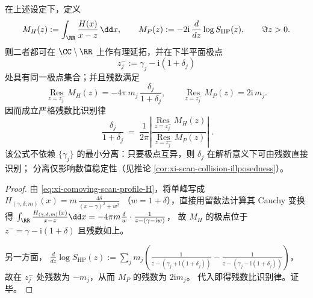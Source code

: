 

\begin{theorem}\label{thm:xi-double-herglotz-residue-ratio}
在上述设定下，定义
\[
M_H(z):=\int_{\RR}\frac{H(x)}{x-z}\,\dd x,
\qquad
M_P(z):=-2\mathrm{i}\,\frac{d}{dz}\log S_{\mathrm{HP}}(z),
\qquad \Im z>0.
\]
则二者都可在 \(\CC\setminus\RR\) 上作有理延拓，并在下半平面极点
\[
z_j^-:=\gamma_j-\mathrm{i}(1+\delta_j)
\]
处具有同一极点集合；并且残数满足
\[
\operatorname*{Res}_{z=z_j^-} M_H(z)= -4\pi\,m_j\,\frac{\delta_j}{1+\delta_j},
\qquad
\operatorname*{Res}_{z=z_j^-} M_P(z)= 2\mathrm{i}\,m_j.
\]
因而成立严格残数比识别律
\[
\boxed{\;
\frac{\delta_j}{1+\delta_j}
\ =\
\frac{1}{2\pi}\left|\frac{\operatorname*{Res}_{z=z_j^-} M_H(z)}{\operatorname*{Res}_{z=z_j^-} M_P(z)}\right|\; }.
\]
该公式不依赖 \(\{\gamma_j\}\) 的最小分离：只要极点互异，则 \(\delta_j\) 在解析意义下可由残数直接识别；
分离仅影响数值稳定性（见推论 \ref{cor:xi-scan-collision-illposedness}）。
\end{theorem}

\begin{proof}
由 \eqref{eq:xi-comoving-scan-profile-H}，将单峰写成
\(
H_{(\gamma,\delta,m)}(x)=m\,\frac{4\delta}{(x-\gamma)^2+w^2}
\)
（\(w=1+\delta\)），直接用留数法计算其 Cauchy 变换得
\(
\int_{\RR}\frac{H_{(\gamma,\delta,m)}(x)}{x-z}\dd x
=-4\pi m\frac{\delta}{w}\cdot\frac{1}{z-(\gamma-\mathrm{i}w)}
\)，
故 \(M_H\) 的极点位于 \(z^-=\gamma-\mathrm{i}(1+\delta)\) 且残数如上。
\par
另一方面，
\(
\frac{d}{dz}\log S_{\mathrm{HP}}(z)
:=\sum_{j}m_j\left(\frac{1}{z-(\gamma_j+\mathrm{i}(1+\delta_j))}-\frac{1}{z-(\gamma_j-\mathrm{i}(1+\delta_j))}\right)
\)，
故在 \(z_j^-\) 处残数为 \(-m_j\)，从而 \(M_P\) 的残数为 \(2\mathrm{i}m_j\)。
代入即得残数比识别律。证毕。
\end{proof}

